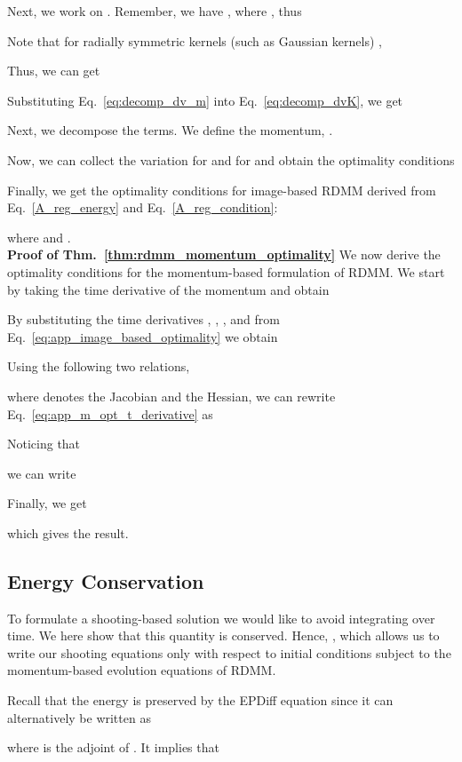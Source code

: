 \documentclass{article}
\numberwithin{equation}{section}
\begin{document}
Next, we work on .  Remember,  we have , where , thus



Note that for radially symmetric kernels (such as Gaussian kernels) ,  

Thus, we can get


Substituting Eq.~\eqref{eq:decomp_dv_m} into Eq.~\eqref{eq:decomp_dvK}, we get 




Next, we decompose the  terms. We define the momentum,  .


Now, we can collect the variation  for  and  for  and obtain the optimality conditions 




Finally, we get the optimality conditions for image-based RDMM derived from Eq.~\eqref{A_reg_energy} and Eq.~\eqref{A_reg_condition}:

where  and .\\

{\bf Proof of Thm.~\eqref{thm:rdmm_momentum_optimality}}
We now derive the optimality conditions for the momentum-based formulation of RDMM. We start by taking the time derivative of the momentum and obtain

By substituting the time derivatives , , , and  from Eq.~\eqref{eq:app_image_based_optimality} we obtain

Using the following two relations,

where  denotes the Jacobian and  the Hessian, we can rewrite Eq.~\eqref{eq:app_m_opt_t_derivative} as

Noticing that

we can write 

Finally, we get

which gives the result.

\subsection{Energy Conservation}
\label{sec:energy_conservation}

To formulate a shooting-based solution we would like to avoid integrating  over time. We here show that this quantity is conserved. Hence, , which allows us to write our shooting equations only with respect to initial conditions subject to the momentum-based evolution equations of RDMM.

Recall that the energy is preserved by the EPDiff equation since it can alternatively be written as 

where  is the adjoint of .
It implies that 
\end{document}
